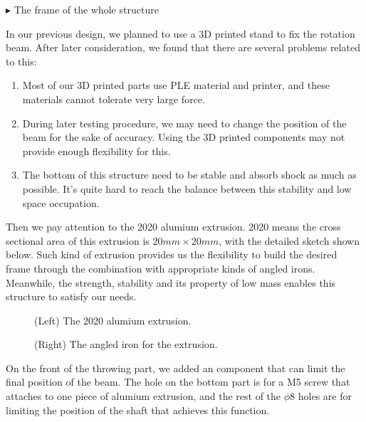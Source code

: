 \documentclass{article}
\begin{document}
$\blacktriangleright$ The frame of the whole structure
\par In our previous design, we planned to use a 3D printed stand to fix the rotation beam. After later consideration, we found that there are several problems related to this:
\begin{enumerate}
\item Most of our 3D printed parts use PLE material and printer, and these materials cannot tolerate very large force.
\item During later testing procedure, we may need to change the position of the beam for the sake of accuracy. Using the 3D printed components may not provide enough flexibility for this.
\item The bottom of this structure need to be stable and absorb shock as much as possible. It's quite hard to reach the balance between this stability and low space occupation.
\end{enumerate}
\par Then we pay attention to the 2020 alumium extrusion. 2020 means the cross sectional area of this extrusion is $20mm\times 20mm$, with the detailed sketch shown below. Such kind of extrusion provides us the flexibility to build the desired frame through the combination with appropriate kinds of angled irons. Meanwhile, the strength, stability and its property of low mass enables this structure to satisfy our needs. 
\begin{figure}[H]
\centering
{}
\caption{(Left) The 2020 alumium extrusion.}
\caption{(Right) The angled iron for the extrusion.}
\end{figure}
\par On the front of the throwing part, we added an component that can limit the final position of the beam. The hole on the bottom part is for a M5 screw that attaches to one piece of alumium extrusion, and the rest of the $\phi 8$ holes are for limiting the position of the shaft that achieves this function.
\end{document}
